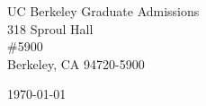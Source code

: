 \begin{minipage}{0.49\textwidth}
\begin{flushleft}
\noindent
UC Berkeley Graduate Admissions\\
318 Sproul Hall\\
\#5900\\
Berkeley, CA 94720-5900
\end{flushleft}
\end{minipage}
\begin{minipage}{0.47\textwidth}
\begin{flushright}
\today
\end{flushright}
\end{minipage} \\

\newcommand{\univ}{University of California, Berkeley}
\newcommand{\univshort}{UC Berkeley}
\newcommand{\degree}{M.Sc.}
\newcommand{\dept}{Computer Science}

